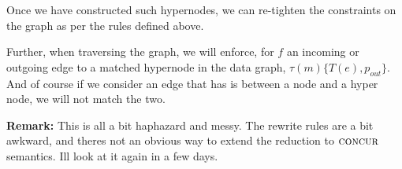 Once we have constructed such hypernodes, we can re-tighten the constraints on
the graph as per the rules defined above.

Further, when traversing the graph, we will enforce, for $f$ an incoming or
outgoing edge to a matched hypernode in the data graph, $\tau(m)\{T(e),
p_{out}\}$. And of course if we consider an edge that has is between a node and
a hyper node, we will not match the two.


\noindent\textbf{Remark:} This is all a bit haphazard and messy. The rewrite
rules are a bit awkward, and theres not an obvious way to extend the reduction
to $\textsc{concur}$ semantics. Ill look at it again in a few days. 
